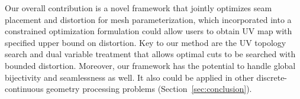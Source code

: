 Our overall contribution is a novel framework that jointly optimizes seam placement and distortion for mesh parameterization, which incorporated into a constrained optimization formulation could allow users to obtain UV map with specified upper bound on distortion. Key to our method are the UV topology search and dual variable treatment that allows optimal cuts to be searched with bounded distortion. Moreover, our framework has the potential to handle global bijectivity and seamlessness as well. It also could be applied in other discrete-continuous geometry processing problems (Section~\ref{sec:conclusion}).
